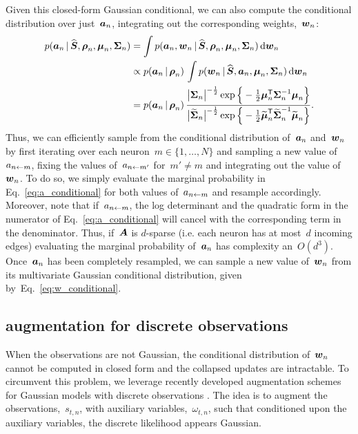 Given this closed-form Gaussian conditional, we can also compute
the conditional distribution over just~$\boldsymbol{a}_n$, integrating out
the corresponding weights,~$\boldsymbol{w}_n$:
\begin{align}
  p(\boldsymbol{a}_n \,|\, \widehat{\boldsymbol{S}}, \boldsymbol{\rho}_n, \boldsymbol{\mu}_n, \boldsymbol{\Sigma}_n)
  &= \int p(\boldsymbol{a}_n, \boldsymbol{w}_n \,|\, \widehat{\boldsymbol{S}}, \boldsymbol{\rho}_n, \boldsymbol{\mu}_n, \boldsymbol{\Sigma}_n) \, \mathrm{d} \boldsymbol{w}_n \\
  &\propto p(\boldsymbol{a}_n \,|\, \boldsymbol{\rho}_n) \, \int p(\boldsymbol{w}_n \,|\, \widehat{\boldsymbol{S}}, \boldsymbol{a}_n, \boldsymbol{\mu}_n, \boldsymbol{\Sigma}_n) \, \mathrm{d} \boldsymbol{w}_n \\
  \label{eq:a_conditional}
  &= p(\boldsymbol{a}_n \,|\, \boldsymbol{\rho}_n) \, \frac{\big| \boldsymbol{\Sigma}_n \big|^{-\frac{1}{2}} \exp \Big \{-\frac{1}{2} \boldsymbol{\mu}_n^{\mathsf{T}} \boldsymbol{\Sigma}_n^{-1} \boldsymbol{\mu}_n \Big \} }
  {\big| \widetilde{\boldsymbol{\Sigma}}_n \big|^{-\frac{1}{2}} \exp \Big \{-\frac{1}{2} \widetilde{\boldsymbol{\mu}}_n^{\mathsf{T}} \widetilde{\boldsymbol{\Sigma}}_n^{-1} \widetilde{\boldsymbol{\mu}}_n \Big \}}.
\end{align}
Thus, we can efficiently sample from the conditional
distribution of~$\boldsymbol{a}_n$ and~$\boldsymbol{w}_n$ by first iterating
over each neuron~${m \in \{1, \ldots, N\}}$ and sampling
a new value of~$a_{n \leftarrow m}$, fixing the values of~$a_{n \leftarrow m'}$
for~$m' \neq m$ and integrating out the value of~$\boldsymbol{w}_n$.
To do so, we simply evaluate the marginal probability in Eq.~\ref{eq:a_conditional}
for both values of~$a_{n \leftarrow m}$ and resample accordingly.
Moreover, note that if~$a_{n \leftarrow m}$, the log determinant and the quadratic
form in the numerator of Eq.~\ref{eq:a_conditional} will cancel with the
corresponding term in the denominator. Thus, if~$\boldsymbol{A}$ is $d$-sparse (i.e. 
each neuron  has at most~$d$ incoming edges) evaluating
the marginal probability of~$\boldsymbol{a}_n$ has complexity an~$O(d^3)$.
Once~$\boldsymbol{a}_n$ has been completely
resampled, we can sample a new value of~$\boldsymbol{w}_n$ from its multivariate
Gaussian conditional distribution, given by~Eq.~\ref{eq:w_conditional}.

\subsection{\polyagamma augmentation for discrete observations}
When the observations are not Gaussian, the conditional distribution
of~$\boldsymbol{w}_n$ cannot be computed in closed form and the collapsed
updates are intractable. To circumvent this problem, we leverage
recently developed augmentation schemes for Gaussian models with
discrete observations \cite{polson2013bayesian, Pillow2012}. The
idea is to augment the observations,~$s_{t,n}$, with auxiliary
variables,~$\omega_{t,n}$, such that conditioned upon the
auxiliary variables, the discrete likelihood appears Gaussian.

